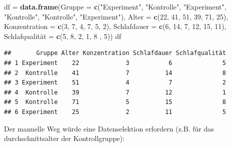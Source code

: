 \documentclass[
]{book}
\newenvironment{Shaded}{\begin{snugshade}}{\end{snugshade}}
\newcommand{\AttributeTok}[1]{\textcolor[rgb]{0.13,0.29,0.53}{#1}}
\newcommand{\DecValTok}[1]{\textcolor[rgb]{0.00,0.00,0.81}{#1}}
\newcommand{\FunctionTok}[1]{\textcolor[rgb]{0.13,0.29,0.53}{\textbf{#1}}}
\newcommand{\NormalTok}[1]{#1}
\newcommand{\OtherTok}[1]{\textcolor[rgb]{0.56,0.35,0.01}{#1}}
\newcommand{\SpecialCharTok}[1]{\textcolor[rgb]{0.81,0.36,0.00}{\textbf{#1}}}
\newcommand{\StringTok}[1]{\textcolor[rgb]{0.31,0.60,0.02}{#1}}
\begin{document}
\begin{Shaded}
\begin{Highlighting}[]
\NormalTok{df }\OtherTok{=} \FunctionTok{data.frame}\NormalTok{(}\AttributeTok{Gruppe =} \FunctionTok{c}\NormalTok{(}\StringTok{"Experiment"}\NormalTok{, }\StringTok{"Kontrolle"}\NormalTok{, }\StringTok{"Experiment"}\NormalTok{, }\StringTok{"Kontrolle"}\NormalTok{, }\StringTok{"Kontrolle"}\NormalTok{, }\StringTok{"Experiment"}\NormalTok{),}
                \AttributeTok{Alter =} \FunctionTok{c}\NormalTok{(}\DecValTok{22}\NormalTok{, }\DecValTok{41}\NormalTok{, }\DecValTok{51}\NormalTok{, }\DecValTok{39}\NormalTok{, }\DecValTok{71}\NormalTok{, }\DecValTok{25}\NormalTok{),}
                \AttributeTok{Konzentration =} \FunctionTok{c}\NormalTok{(}\DecValTok{3}\NormalTok{, }\DecValTok{7}\NormalTok{, }\DecValTok{4}\NormalTok{, }\DecValTok{7}\NormalTok{, }\DecValTok{5}\NormalTok{, }\DecValTok{2}\NormalTok{),}
                \AttributeTok{Schlafdauer =} \FunctionTok{c}\NormalTok{(}\DecValTok{6}\NormalTok{, }\DecValTok{14}\NormalTok{, }\DecValTok{7}\NormalTok{, }\DecValTok{12}\NormalTok{, }\DecValTok{15}\NormalTok{, }\DecValTok{11}\NormalTok{),}
\NormalTok{                Schlafqualität }\OtherTok{=} \FunctionTok{c}\NormalTok{(}\DecValTok{5}\NormalTok{, }\DecValTok{8}\NormalTok{, }\DecValTok{2}\NormalTok{, }\DecValTok{1}\NormalTok{, }\DecValTok{8}\NormalTok{ , }\DecValTok{5}\NormalTok{))}
\NormalTok{df}
\end{Highlighting}
\end{Shaded}

\begin{verbatim}
##       Gruppe Alter Konzentration Schlafdauer Schlafqualität
## 1 Experiment    22             3           6              5
## 2  Kontrolle    41             7          14              8
## 3 Experiment    51             4           7              2
## 4  Kontrolle    39             7          12              1
## 5  Kontrolle    71             5          15              8
## 6 Experiment    25             2          11              5
\end{verbatim}

Der manuelle Weg würde eine Datenselektion erfordern (z.B. für das durchschnittsalter der Kontrollgruppe):

\begin{Shaded}
\end{Shaded}
\end{document}
